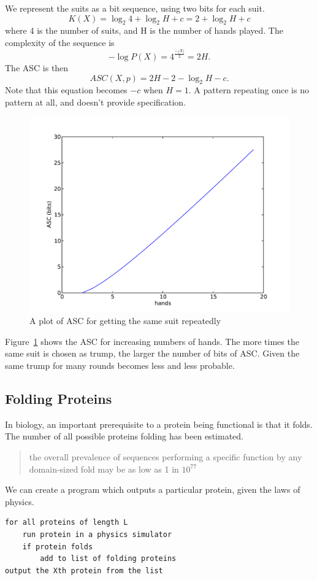 We represent the suits as a bit sequence, using two bits for each suit.
\begin{equation}
    K(X) = \log_2 4 + \log_2 H + c = 2 + \log_2 H + c
\end{equation} where 4 is the number of suits, and H is the number of hands played.
The complexity of the sequence is 
\begin{equation}
    -\log P(X) = 4^\frac{-|X|}{2} = 2H \mbox{.}
\end{equation}
The ASC is then
\begin{equation}
    ASC(X,p) = 2H - 2 - \log_2 H - c \mbox{.}
\end{equation}
Note that this equation becomes $-c$ when $H=1$.
A pattern repeating once is no pattern at all, and doesn't provide specification.
\begin{figure}
    \includegraphics[width=\textwidth]{EwertRepeat}
    \caption{A plot of ASC for getting the same suit repeatedly}
    \label{suit.plot}
\end{figure}
Figure~\ref{suit.plot} shows the ASC for increasing numbers of hands.
The more times the same suit is chosen as trump, the larger the number of bits of ASC.
Given the same trump for many rounds becomes less and less probable.

\subsection{Folding Proteins}
\label{sec_folding}

In biology, an important prerequisite to a protein being functional is that it folds.
The number of all possible proteins folding has been estimated.
\begin{quotation}
    the overall prevalence of sequences performing a specific function by any domain-sized fold may be as low as 1 in $10^{77}$ \cite{axe2004}
\end{quotation}
We can create a program which outputs a particular protein, given the laws of physics.
\begin{verbatim}
for all proteins of length L
    run protein in a physics simulator
    if protein folds
        add to list of folding proteins
output the Xth protein from the list
\end{verbatim}

